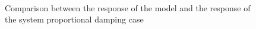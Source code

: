 %
\begin{figure}
	\ContinuedFloat
	\centering	
		\\
	\caption{Comparison between the response of the model and the response of the system proportional damping case}
	\label{fig:proportionaldamping}
\end{figure}

